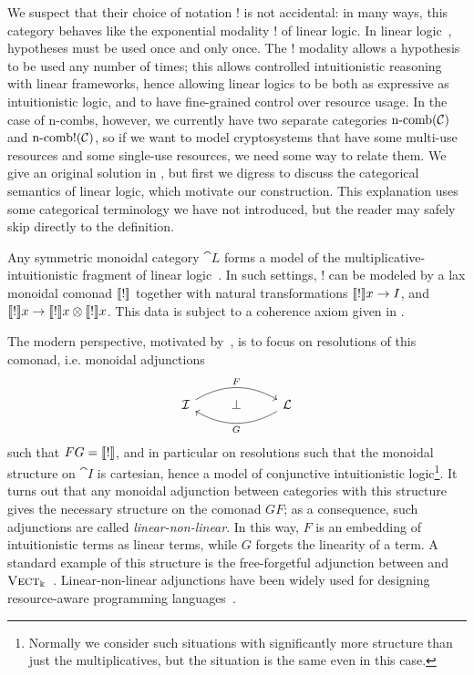 We suspect that their choice of notation $!$
is not accidental: in many ways, this category behaves like the exponential
modality $!$ of linear logic. In linear logic~\cite{girard-1987}, hypotheses
must be used once and only once. The $!$ modality allows a hypothesis to be used
any number of times; this allows controlled intuitionistic reasoning with linear
frameworks, hence allowing linear logics to be both as expressive as intuitionistic
logic, and to have fine-grained control over resource usage. In the case of
n-combs, however, we currently have two separate categories $\operatorname*{n-comb}({\mathcal{C}})$
and $\operatorname*{n-comb!}({\mathcal{C}})$, so if we want to model cryptosystems that have some
multi-use resources and some single-use resources, we need some way to relate
them. We give an original solution in , but
first we digress to discuss the categorical semantics of linear logic, which
motivate our construction. This explanation uses some categorical terminology we
have not introduced, but the reader may safely skip directly to the definition.

Any symmetric monoidal category $\cat{L}$ forms a model of the
multiplicative-intuitionistic fragment of linear logic~\cite{mellies-2009}. In such
settings, $!$ can be modeled by a lax monoidal comonad $\llbracket ! \rrbracket$ together
with natural transformations $\llbracket ! \rrbracket x\to I$, and
$\llbracket ! \rrbracket x\to\llbracket ! \rrbracket x\otimes\llbracket ! \rrbracket x$. This data is subject to a
coherence axiom given in \cite[Equation 72]{mellies-2009}.

The modern perspective, motivated by~\cite{benton-1995}, is to focus on
resolutions of this comonad, i.e. monoidal adjunctions \[
  \begin{tikzcd}
    \cat{I}\ar[rr, bend left, "F"] & \bot & \cat{L}\ar[ll, bend left, "G"]
  \end{tikzcd}
\]such that $FG = \llbracket ! \rrbracket$, and in particular on resolutions such that the
monoidal structure on $\cat{I}$ is cartesian, hence a model of conjunctive
intuitionistic logic\footnote{
  Normally we consider such situations with significantly more structure than just
  the multiplicatives, but the situation is the same even in this case.
}. It turns out that any monoidal adjunction between categories with this
structure gives the necessary structure on the comonad $GF$; as a consequence,
such adjunctions are called \emph{linear-non-linear}. In this way, $F$ is an
embedding of intuitionistic terms as linear terms, while $G$ forgets the
linearity of a term. A standard example of this structure is the free-forgetful
adjunction between  and
${\textsc{\text{Vect}}}_\Bbbk$~\cite{valiron-zdancewic-2014}. Linear-non-linear adjunctions
have been widely used for designing resource-aware programming
languages~\cite{maf-2005,krishnaswami-2015,paykin-2018,lmz-2019}.

